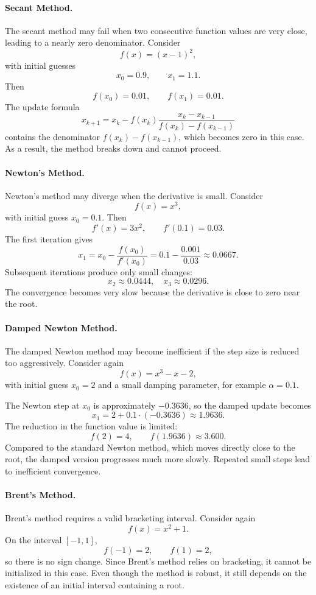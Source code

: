 \paragraph{Secant Method.}
The secant method may fail when two consecutive function values are very close, leading to a nearly zero denominator. Consider
\[
f(x) = (x - 1)^2,
\]
with initial guesses
\[
x_0 = 0.9, \qquad x_1 = 1.1.
\]
Then
\[
f(x_0) = 0.01, \qquad f(x_1) = 0.01.
\]
The update formula
\[
x_{k+1} = x_k - f(x_k)\frac{x_k - x_{k-1}}{f(x_k) - f(x_{k-1})}
\]
contains the denominator \(f(x_k) - f(x_{k-1})\), which becomes zero in this case. As a result, the method breaks down and cannot proceed.

\paragraph{Newton's Method.}
Newton's method may diverge when the derivative is small. Consider
\[
f(x) = x^3,
\]
with initial guess \(x_0 = 0.1\). Then
\[
f'(x) = 3x^2, \qquad f'(0.1) = 0.03.
\]
The first iteration gives
\[
x_1 = x_0 - \frac{f(x_0)}{f'(x_0)} = 0.1 - \frac{0.001}{0.03} \approx 0.0667.
\]
Subsequent iterations produce only small changes:
\[
x_2 \approx 0.0444, \quad x_3 \approx 0.0296.
\]
The convergence becomes very slow because the derivative is close to zero near the root.

\paragraph{Damped Newton Method.}
The damped Newton method may become inefficient if the step size is reduced too aggressively. Consider again
\[
f(x) = x^3 - x - 2,
\]
with initial guess \(x_0 = 2\) and a small damping parameter, for example \(\alpha = 0.1\).

The Newton step at \(x_0\) is approximately \(-0.3636\), so the damped update becomes
\[
x_1 = 2 + 0.1 \cdot (-0.3636) \approx 1.9636.
\]
The reduction in the function value is limited:
\[
f(2) = 4, \qquad f(1.9636) \approx 3.600.
\]
Compared to the standard Newton method, which moves directly close to the root, the damped version progresses much more slowly. Repeated small steps lead to inefficient convergence.

\paragraph{Brent's Method.}
Brent's method requires a valid bracketing interval. Consider again
\[
f(x) = x^2 + 1.
\]
On the interval \([-1, 1]\),
\[
f(-1) = 2, \qquad f(1) = 2,
\]
so there is no sign change. Since Brent's method relies on bracketing, it cannot be initialized in this case. Even though the method is robust, it still depends on the existence of an initial interval containing a root.

